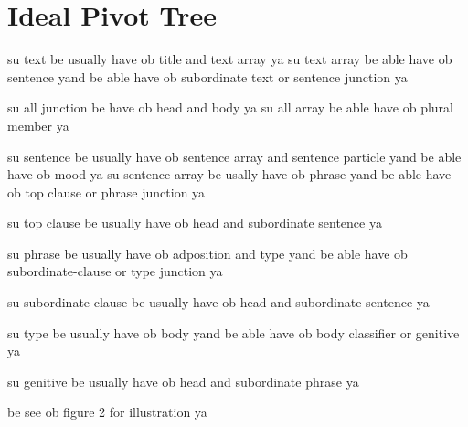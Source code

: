 \documentclass[12pt]{article}
\begin{document}
\newpage
\section{Ideal Pivot Tree}

su text be usually have ob title and text array ya
su text array be able have ob sentence yand
be able have ob subordinate text or sentence junction ya

su all junction be have ob head and body ya
su all array be able have ob plural member ya

su sentence be usually have ob sentence array and sentence
particle yand be able have ob mood ya
su sentence array be usally have ob  phrase yand
be able have ob top clause or phrase junction ya

su top clause be usually have ob head and subordinate sentence ya

su phrase be usually have ob adposition and type
yand be able have ob subordinate-clause or type junction ya

su subordinate-clause be usually have ob head and 
subordinate sentence ya

su type be usually have ob body yand be able have ob 
body classifier or genitive ya

su genitive be usually have ob head and subordinate phrase ya

be see ob figure 2 for illustration ya
\end{document}
